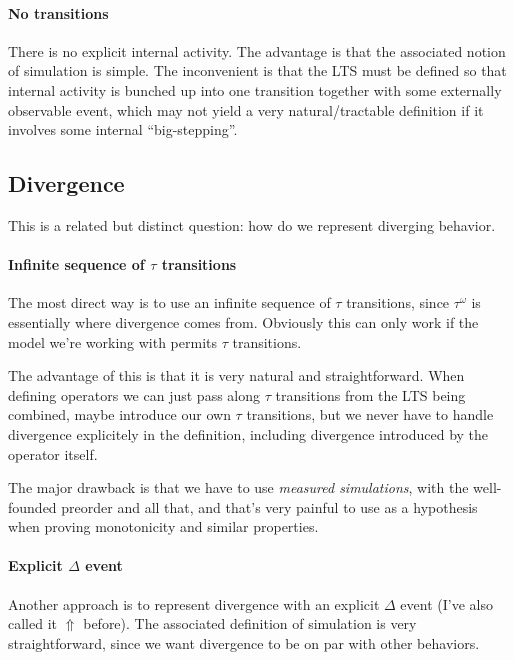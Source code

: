 \documentclass[11pt]{article}
\begin{document}
\paragraph{No transitions}

There is no explicit internal activity.
The advantage is that
the associated notion of simulation is simple.
The inconvenient is that
the LTS must be defined so that
internal activity is bunched up into one transition
together with some externally observable event,
which may not yield a very natural/tractable definition
if it involves some internal ``big-stepping''.


\subsection{Divergence} %

This is a related but distinct question:
how do we represent diverging behavior.

\paragraph{Infinite sequence of $\tau$ transitions}

The most direct way is to use an infinite sequence of $\tau$ transitions,
since $\tau^\omega$ is essentially where divergence comes from.
Obviously this can only work if the model we're working with
permits $\tau$ transitions.

The advantage of this is that it is very natural and straightforward.
When defining operators we can just pass along $\tau$ transitions from
the LTS being combined,
maybe introduce our own $\tau$ transitions,
but we never have to handle divergence explicitely
in the definition,
including divergence introduced by the operator itself.

The major drawback is that we have to use \emph{measured simulations},
with the well-founded preorder and all that,
and that's very painful to use as a hypothesis
when proving monotonicity and similar properties.

\paragraph{Explicit $\Delta$ event}

Another approach is to represent divergence
with an explicit $\Delta$ event (I've also called it $\Uparrow$ before).
The associated definition of simulation is very straightforward,
since we want divergence to be on par with other behaviors.
\end{document}
